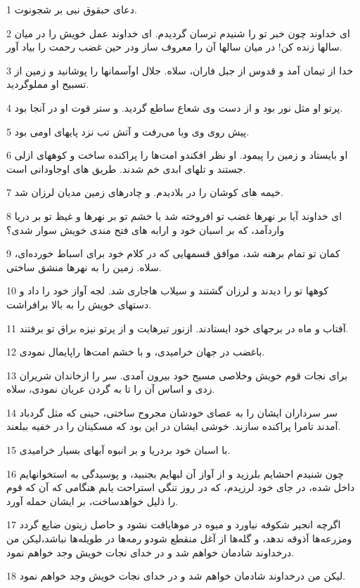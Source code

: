 \par 1 دعای حبقوق نبی بر شجونوت.
\par 2 ای خداوند چون خبر تو را شنیدم ترسان گردیدم. ای خداوند عمل خویش را در میان سالها زنده کن! در میان سالها آن را معروف ساز ودر حین غضب رحمت را بیاد آور.
\par 3 خدا از تیمان آمد و قدوس از جبل فاران، سلاه. جلال اوآسمانها را پوشانید و زمین از تسبیح او مملوگردید.
\par 4 پرتو او مثل نور بود و از دست وی شعاع ساطع گردید. و ستر قوت او در آنجا بود.
\par 5 پیش روی وی وبا می‌رفت و آتش تب نزد پایهای اومی بود.
\par 6 او بایستاد و زمین را پیمود. او نظر افکندو امت‌ها را پراکنده ساخت و کوههای ازلی جستند و تلهای ابدی خم شدند. طریق های اوجاودانی است.
\par 7 خیمه های کوشان را در بلادیدم. و چادرهای زمین مدیان لرزان شد.
\par 8 ‌ای خداوند آیا بر نهرها غضب تو افروخته شد یا خشم تو بر نهرها و غیظ تو بر دریا واردآمد، که بر اسبان خود و ارابه های فتح مندی خویش سوار شدی؟
\par 9 کمان تو تمام برهنه شد، موافق قسمهایی که در کلام خود برای اسباط خورده‌ای، سلاه. زمین را به نهرها منشق ساختی.
\par 10 کوهها تو را دیدند و لرزان گشتند و سیلاب هاجاری شد. لجه آواز خود را داد و دستهای خویش را به بالا برافراشت.
\par 11 آفتاب و ماه در برجهای خود ایستادند. ازنور تیرهایت و از پرتو نیزه براق تو برفتند.
\par 12 باغضب در جهان خرامیدی، و با خشم امت‌ها راپایمال نمودی.
\par 13 برای نجات قوم خویش وخلاصی مسیح خود بیرون آمدی. سر را ازخاندان شریران زدی و اساس آن را تا به گردن عریان نمودی، سلاه.
\par 14 سر سرداران ایشان را به عصای خودشان مجروح ساختی، حینی که مثل گردباد آمدند تامرا پراکنده سازند. خوشی ایشان در این بود که مسکینان را در خفیه ببلعند.
\par 15 با اسبان خود بردریا و بر انبوه آبهای بسیار خرامیدی.
\par 16 چون شنیدم احشایم بلرزید و از آواز آن لبهایم بجنبید، و پوسیدگی به استخوانهایم داخل شده، در جای خود لرزیدم، که در روز تنگی استراحت یابم هنگامی که آن که قوم را ذلیل خواهدساخت، بر ایشان حمله آورد.
\par 17 اگرچه انجیر شکوفه نیاورد و میوه در موهایافت نشود و حاصل زیتون ضایع گردد ومزرعه‌ها آذوقه ندهد، و گله‌ها از آغل منقطع شودو رمه‌ها در طویله‌ها نباشد،لیکن من درخداوند شادمان خواهم شد و در خدای نجات خویش وجد خواهم نمود.
\par 18 لیکن من درخداوند شادمان خواهم شد و در خدای نجات خویش وجد خواهم نمود.


